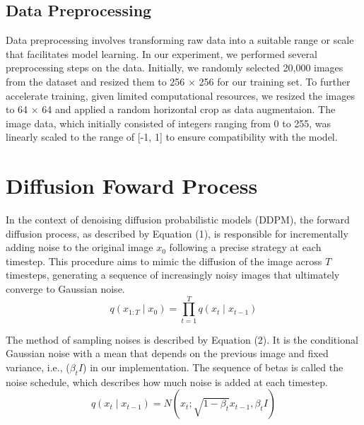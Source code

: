 \documentclass[letterpaper]{article} %
\begin{document}
\subsection{Data Preprocessing}
Data preprocessing involves transforming raw data into a suitable range or scale that facilitates model learning. In our experiment, we performed several preprocessing steps on the data. Initially, we randomly selected 20,000 images from the dataset and resized them to 256 $\times$ 256 for our training set. To further accelerate training, given limited computational resources, we resized the images to 64 $\times$ 64 and applied a random horizontal crop as data augmentaion. The image data, which initially consisted of integers ranging from 0 to 255, was linearly scaled to the range of [-1, 1] to ensure compatibility with the model.

\section{Diffusion Foward Process}
In the context of denoising diffusion probabilistic models (DDPM), the forward diffusion process, as described by Equation (1), is responsible for incrementally adding noise to the original image $x_0$ following a precise strategy at each timestep. This procedure aims to mimic the diffusion of the image across $T$ timesteps, generating a sequence of increasingly noisy images that ultimately converge to Gaussian noise.
\begin{equation}
q\left(x_{1: T} \mid x_0\right)=\prod_{t=1}^T q\left(x_t \mid x_{t-1}\right)
\end{equation}

The method of sampling noises is described by Equation (2). It is the conditional Gaussian noise with a mean that depends on the previous image and fixed variance, i.e., ($\beta_t I$) in our implementation. The sequence of betas is called the noise schedule, which describes how much noise is added at each timestep.
\begin{equation}
q\left(x_t \mid x_{t-1}\right)=N\left(x_t ; \sqrt{1-\beta_t} x_{t-1}, \beta_t I\right)
\end{equation}
\end{document}
